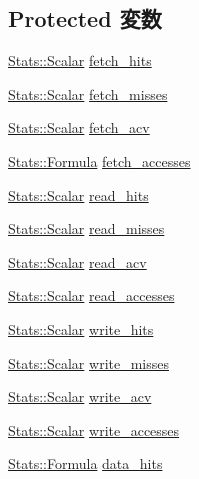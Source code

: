 \subsection*{Protected 変数}
\begin{DoxyCompactItemize}
\item 
\hyperlink{classStats_1_1Scalar}{Stats::Scalar} \hyperlink{classAlphaISA_1_1TLB_a41b41877cc14c93d0663a37014aaa605}{fetch\_\-hits}
\item 
\hyperlink{classStats_1_1Scalar}{Stats::Scalar} \hyperlink{classAlphaISA_1_1TLB_a5801332ce26351763f996ea8aa050a96}{fetch\_\-misses}
\item 
\hyperlink{classStats_1_1Scalar}{Stats::Scalar} \hyperlink{classAlphaISA_1_1TLB_a91197c087b25a1ccf96a6c15523b6d1a}{fetch\_\-acv}
\item 
\hyperlink{classStats_1_1Formula}{Stats::Formula} \hyperlink{classAlphaISA_1_1TLB_ae73b1ec9b8b461b5c5b0f1f903692418}{fetch\_\-accesses}
\item 
\hyperlink{classStats_1_1Scalar}{Stats::Scalar} \hyperlink{classAlphaISA_1_1TLB_a766fdbd2ab7d588c3c9fa426ce395ed6}{read\_\-hits}
\item 
\hyperlink{classStats_1_1Scalar}{Stats::Scalar} \hyperlink{classAlphaISA_1_1TLB_a6fb393c9489d735739552c2a351f07f4}{read\_\-misses}
\item 
\hyperlink{classStats_1_1Scalar}{Stats::Scalar} \hyperlink{classAlphaISA_1_1TLB_af50813bd757bd59aa3618aa99377760a}{read\_\-acv}
\item 
\hyperlink{classStats_1_1Scalar}{Stats::Scalar} \hyperlink{classAlphaISA_1_1TLB_a2c9dc5a6baf7fbd1ae7fc00b0a57fe56}{read\_\-accesses}
\item 
\hyperlink{classStats_1_1Scalar}{Stats::Scalar} \hyperlink{classAlphaISA_1_1TLB_ab3172bfd014e75dcad1b0a2a91de59dd}{write\_\-hits}
\item 
\hyperlink{classStats_1_1Scalar}{Stats::Scalar} \hyperlink{classAlphaISA_1_1TLB_af8519a07f8f1f76c8fff9c9a1aaa4638}{write\_\-misses}
\item 
\hyperlink{classStats_1_1Scalar}{Stats::Scalar} \hyperlink{classAlphaISA_1_1TLB_a764f5ef97bfcb1ba3ad05704de5a3a32}{write\_\-acv}
\item 
\hyperlink{classStats_1_1Scalar}{Stats::Scalar} \hyperlink{classAlphaISA_1_1TLB_af3301e9dd0bb91de161b7bafefade7f3}{write\_\-accesses}
\item 
\hyperlink{classStats_1_1Formula}{Stats::Formula} \hyperlink{classAlphaISA_1_1TLB_a2252d249bb340d0061f5e3b7cf2bfe5b}{data\_\-hits}
\item 

\end{DoxyCompactItemize}
